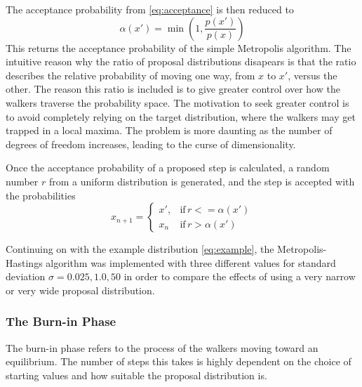 The acceptance probability from \ref{eq:acceptance} is then reduced to
\begin{equation}
  \alpha(x') = \min \left( 1, \frac{p(x')}{p(x)} \right)
\end{equation}
This returns the acceptance probability of the simple Metropolis algorithm. The
intuitive reason why the ratio of proposal distributions disapears is that the
ratio describes the relative probability of moving one way, from $x$ to $x'$,
versus the other. The reason this ratio is included is to give greater control
over how the walkers traverse the probability space. The motivation to seek
greater control is to avoid completely relying on the target distribution, where
the walkers may get trapped in a local maxima. The problem is more daunting as
the number of degrees of freedom increases, leading to the curse of
dimensionality.

Once the acceptance probability of a proposed step is calculated, a random
number $r$ from a uniform distribution is generated, and the step is accepted
with the probabilities
\begin{equation}
  x_{n+1} = \left\{
    \begin{array}{lr}
      x', & \text{if} \, r <= \alpha(x') \\
      x_n & \text{if} \, r > \alpha(x')
    \end{array}
  \right.
\end{equation}

Continuing on with the example distribution \ref{eq:example}, the
Metropolis-Hastings algorithm was implemented with three different values for
standard deviation $\sigma = 0.025, 1.0, 50$ in order to compare the effects of
using a very narrow or very wide proposal distribution.


\subsubsection{The Burn-in Phase}
The burn-in phase refers to the process of the walkers moving toward an
equilibrium. The number of steps this takes is highly dependent on the choice of
starting values and how suitable the proposal distribution is. 

